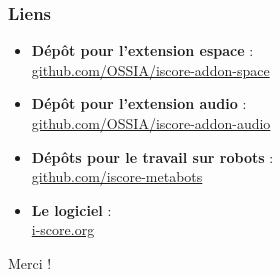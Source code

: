 \documentclass{beamer}
\begin{document}
\begin{frame}
    \frametitle{Liens} 
    \Large
    \begin{itemize}
        \setlength\itemsep{1em}
        \item \textbf{Dépôt pour l'extension espace} :~\\
        \url{github.com/OSSIA/iscore-addon-space}
        \item \textbf{Dépôt pour l'extension audio} :~\\
        \url{github.com/OSSIA/iscore-addon-audio}
        \item \textbf{Dépôts pour le travail sur robots} :~\\
        \url{github.com/iscore-metabots}
        \item \textbf{Le logiciel} :~\\
         \url{i-score.org}
    \end{itemize}
        
    \centering
    \vspace{2em}
    \Large{Merci !}
\end{frame}    
\end{document}
